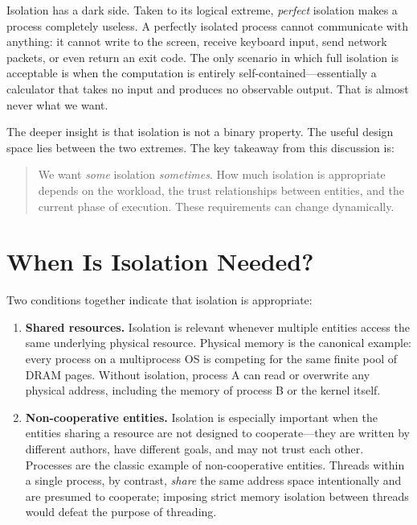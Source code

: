 \documentclass[11pt]{article}
\begin{document}
Isolation has a dark side. Taken to its logical extreme, \emph{perfect} isolation makes a
process completely useless. A perfectly isolated process cannot communicate with anything:
it cannot write to the screen, receive keyboard input, send network packets, or even return
an exit code. The only scenario in which full isolation is acceptable is when the computation
is entirely self-contained---essentially a calculator that takes no input and produces no
observable output. That is almost never what we want.

The deeper insight is that isolation is not a binary property. The useful design space lies
between the two extremes. The key takeaway from this discussion is:

\begin{quote}
We want \emph{some} isolation \emph{sometimes}. How much isolation is appropriate depends on
the workload, the trust relationships between entities, and the current phase of execution.
These requirements can change dynamically.
\end{quote}

\section{When Is Isolation Needed?}

Two conditions together indicate that isolation is appropriate:

\begin{enumerate}
    \item \textbf{Shared resources.} Isolation is relevant whenever multiple entities
          access the same underlying physical resource. Physical memory is the canonical
          example: every process on a multiprocess OS is competing for the same finite pool
          of DRAM pages. Without isolation, process A can read or overwrite any physical
          address, including the memory of process B or the kernel itself.

    \item \textbf{Non-cooperative entities.} Isolation is especially important when the
          entities sharing a resource are not designed to cooperate---they are written by
          different authors, have different goals, and may not trust each other. Processes
          are the classic example of non-cooperative entities. Threads within a single
          process, by contrast, \emph{share} the same address space intentionally and are
          presumed to cooperate; imposing strict memory isolation between threads would
          defeat the purpose of threading.
\end{enumerate}
\end{document}
